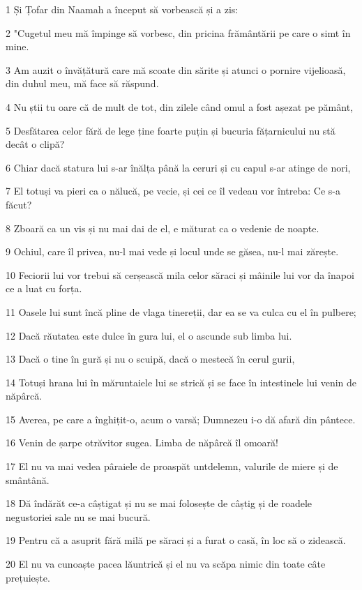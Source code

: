 \par 1 Și Țofar din Naamah a început să vorbească și a zis:
\par 2 "Cugetul meu mă împinge să vorbesc, din pricina frământării pe care o simt în mine.
\par 3 Am auzit o învățătură care mă scoate din sărite și atunci o pornire vijelioasă, din duhul meu, mă face să răspund.
\par 4 Nu știi tu oare că de mult de tot, din zilele când omul a fost așezat pe pământ,
\par 5 Desfătarea celor fără de lege ține foarte puțin și bucuria fățarnicului nu stă decât o clipă?
\par 6 Chiar dacă statura lui s-ar înălța până la ceruri și cu capul s-ar atinge de nori,
\par 7 El totuși va pieri ca o nălucă, pe vecie, și cei ce îl vedeau vor întreba: Ce s-a făcut?
\par 8 Zboară ca un vis și nu mai dai de el, e măturat ca o vedenie de noapte.
\par 9 Ochiul, care îl privea, nu-l mai vede și locul unde se găsea, nu-l mai zărește.
\par 10 Feciorii lui vor trebui să cerșească mila celor săraci și mâinile lui vor da înapoi ce a luat cu forța.
\par 11 Oasele lui sunt încă pline de vlaga tinereții, dar ea se va culca cu el în pulbere;
\par 12 Dacă răutatea este dulce în gura lui, el o ascunde sub limba lui.
\par 13 Dacă o tine în gură și nu o scuipă, dacă o mestecă în cerul gurii,
\par 14 Totuși hrana lui în măruntaiele lui se strică și se face în intestinele lui venin de năpârcă.
\par 15 Averea, pe care a înghițit-o, acum o varsă; Dumnezeu i-o dă afară din pântece.
\par 16 Venin de șarpe otrăvitor sugea. Limba de năpârcă îl omoară!
\par 17 El nu va mai vedea pâraiele de proaspăt untdelemn, valurile de miere și de smântână.
\par 18 Dă îndărăt ce-a câștigat și nu se mai folosește de câștig și de roadele negustoriei sale nu se mai bucură.
\par 19 Pentru că a asuprit fără milă pe săraci și a furat o casă, în loc să o zidească.
\par 20 El nu va cunoaște pacea lăuntrică și el nu va scăpa nimic din toate câte prețuiește.

